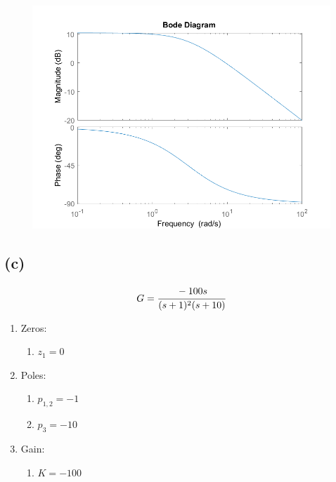 \documentclass[letter]{article}
\numberwithin{equation}{section}
\begin{document}
\begin{figure}[h!]
	\centering
	\includegraphics[width=\textwidth]{figs/pblm2b.png}
\end{figure}


\newpage
\subsection{(c)}
\[
	G = \cfrac{
		-100 s
	}{
		(s+1)^2 (s+10)
	}
\]
\begin{enumerate}
	\item Zeros:
	\begin{enumerate}
		\item $z_1 = 0$
	\end{enumerate}
	\item Poles:
	\begin{enumerate}
		\item $p_{1,2} = -1$
		\item $p_3 = -10$
	\end{enumerate}
	\item Gain:
	\begin{enumerate}
		\item $K = -100$
	\end{enumerate}
\end{enumerate}
\end{document}
